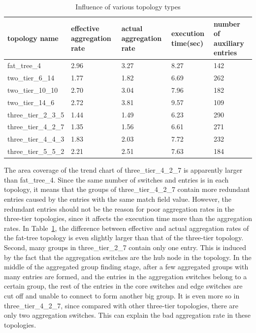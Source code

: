 \documentclass[conference]{IEEEtran}
\begin{document}
\begin{table}
\centering
\caption{Influence of various topology types}
\begin{tabular}{|p{1.8cm}|p{1cm}|p{1.3cm}|p{1.1cm}|p{1.3cm}|}
\hline topology name & effective aggregation rate & actual aggregation rate & execution time(sec) & number of auxiliary entries \\
\hline
\hline fat\_tree\_4 & 2.96 & 3.27 & 8.27 & 142 \\
\hline two\_tier\_6\_14 & 1.77 & 1.82 & 6.69 & 262 \\ 
\hline two\_tier\_10\_10 & 2.70 & 3.04 & 7.96 & 182 \\
\hline two\_tier\_14\_6 & 2.72 & 3.81 & 9.57 & 109 \\ 
\hline three\_tier\_2\_3\_5 & 1.44 & 1.49 & 6.23 & 290 \\
\hline three\_tier\_4\_2\_7 & 1.35 & 1.56 & 6.61 & 271 \\
\hline three\_tier\_4\_4\_3 & 1.83 & 2.03 & 7.72 & 232 \\
\hline three\_tier\_5\_5\_2 & 2.21 & 2.51 & 7.63 & 184 \\
\hline
\end{tabular}
\label{table:different_topo_type}
\end{table}

The area coverage of the trend chart of three\_tier\_4\_2\_7 is apparently larger than fat\_tree\_4. Since the same number of switches and entries is in each topology, it means that the groups of three\_tier\_4\_2\_7 contain more redundant entries caused by the entries with the same match field value. However, the redundant entries should not be the reason for poor aggregation rates in the three-tier topologies, since it affects the execution time more than the aggregation rates. In Table~\ref{table:different_topo_type}, the difference between effective and actual aggregation rates of the fat-tree topology is even slightly larger than that of the three-tier topology. Second, many groups in three\_tier\_2\_7 contain only one entry. This is induced by the fact that the aggregation switches are the hub node in the topology. In the middle of the aggregated group finding stage, after a few aggregated groups with many entries are formed, and the entries in the aggregation switches belong to a certain group, the rest of the entries in the core switches and edge switches are cut off and unable to connect to form another big group. It is even more so in three\_tier\_4\_2\_7, since compared with other three-tier topologies, there are only two aggregation switches. This can explain the bad aggregation rate in these topologies.
\end{document}
